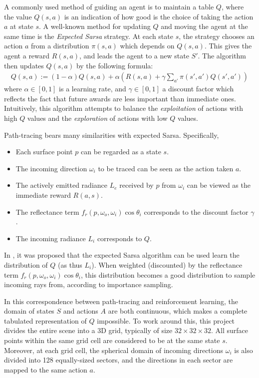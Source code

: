 A commonly used method of guiding an agent is to maintain a table $Q$, where the value $Q(s,a)$ is an indication of how good is the choice of taking the action $a$ at state $s$. A well-known method for updating $Q$ and moving the agent at the same time is the \textit{Expected Sarsa} strategy. At each state $s$, the strategy chooses an action $a$ from a distribution $\pi(s,a)$ which depends on $Q(s,a)$. This gives the agent a reward $R(s,a)$, and leads the agent to a new state $S'$. The algorithm then updates $Q(s,a)$ by the following formula:
\begin{align*}
    Q(s,a) := (1-\alpha) Q(s,a) + \alpha  \left(R(s,a)+\gamma \sum_{a'} \pi(s',a')Q(s',a') \right)
\end{align*}
where $\alpha\in [0,1]$ is a learning rate, and $\gamma\in [0,1]$ a discount factor which reflects the fact that future awards are less important than immediate ones. Intuitively, this algorithm attempts to balance the \textit{exploitation} of actions with high $Q$ values and the \textit{exploration} of actions with low $Q$ values.

Path-tracing bears many similarities with expected Sarsa. Specifically,
\begin{itemize}
    \item Each surface point $p$ can be regarded as a state $s$.
    \item The incoming direction $\omega_i$ to be traced can be seen as the action taken $a$.
    \item The actively emitted radiance $L_e$ received by $p$ from $\omega_i$ can be viewed as the immediate reward $R(a,s)$.
    \item The reflectance term $f_r(p,\omega_o,\omega_i)\cos \theta_i$ corresponds to the discount factor $\gamma$.
    \item The incoming radiance $L_i$ corresponds to $Q$.
\end{itemize}
In \cite{RLPT}, it was proposed that the expected Sarsa algorithm can be used learn the distribution of $Q$ (as thus $L_i$). When weighted (discounted) by the reflectance term $f_r(p,\omega_o,\omega_i)\cos \theta_i$, this distribution becomes a good distribution to sample incoming rays from, according to importance sampling.

In this correspondence between path-tracing and reinforcement learning, the domain of states $S$ and actions $A$ are both continuous, which makes a complete tabulated representation of $Q$ impossible. To work around this, this project divides the entire scene into a 3D grid, typically of size $32\times 32\times 32$. All surface points within the same grid cell are considered to be at the same state $s$. Moreover, at each grid cell, the spherical domain of incoming directions $\omega_i$ is also divided into 128 equally-sized sectors, and the directions in each sector are mapped to the same action $a$. 

